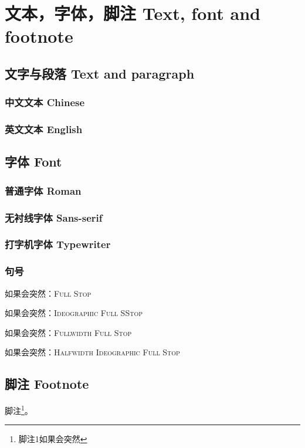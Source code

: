 \mainmatter
\chapter{文本，字体，脚注 \quad Text, font and footnote}
\section{文字与段落 Text and paragraph}
\subsection{中文文本 Chinese}
\zhlipsum

\subsection{英文文本 English}
\kant

\clearpage

\section{字体 Font}
\subsection{普通字体 Roman}
\fonttest

\subsection{无衬线字体 Sans-serif}
\textsf{\fonttest}

\subsection{打字机字体 Typewriter}
\texttt{\fonttest}

\subsection{句号}
如果会突然：\textsc{Full Stop} \par
如果会突然：\textsc{Ideographic Full SStop} \par
如果会突然：\textsc{Fullwidth Full Stop} \par
如果会突然：\textsc{Halfwidth Ideographic Full Stop} \par

\clearpage

\section{脚注 Footnote}
脚注\footnote{脚注1如果会突然}。


